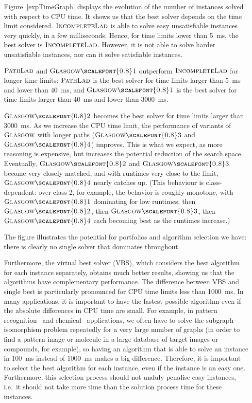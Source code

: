 \documentclass{llncs}
\newcommand{\Glasgow}{$\textsc{Glasgow}$\xspace}
\newcommand{\IncompleteLAD}{$\textsc{IncompleteLad}$\xspace}
\newcommand{\PathLAD}{$\textsc{PathLad}$\xspace}
\newcommand{\GlasgowOne}{$\textsc{Glasgow{\scalefont{0.8}1}}$\xspace}
\newcommand{\GlasgowTwo}{$\textsc{Glasgow{\scalefont{0.8}2}}$\xspace}
\newcommand{\GlasgowThree}{$\textsc{Glasgow{\scalefont{0.8}3}}$\xspace}
\newcommand{\GlasgowFour}{$\textsc{Glasgow{\scalefont{0.8}4}}$\xspace}
\begin{document}
Figure~\ref{expTimeGraph} displays the evolution of the number of instances solved with respect to
CPU time. It shows us that the best solver depends on the time limit considered. \IncompleteLAD is
able to solve easy unsatisfiable instances very quickly, in a few milliseconds. Hence, for time
limits lower than \SI{5}{\ms}, the best solver is \IncompleteLAD. However, it is not able to solve harder
unsatisfiable instances, nor can it solve satisfiable instances.

\PathLAD and \GlasgowOne outperform \IncompleteLAD for longer time limits: \PathLAD is the
best solver for time limits larger than \SI{5}{\ms} and lower than \SI{40}{\ms}, and \GlasgowOne is the best solver
for time limits larger than \SI{40}{\ms} and lower than \SI{3000}{\ms}.

\GlasgowTwo becomes the best solver for time limits larger than \SI{3000}{\ms}.
As we increase the CPU time limit, the performance of variants of \Glasgow with
longer paths (\GlasgowThree and \GlasgowFour) improves. This is what we expect,
as more reasoning is expensive, but increases the potential reduction of the
search space. Eventually, \GlasgowTwo and \GlasgowThree become very closely
matched, and with runtimes very close to the limit, \GlasgowFour nearly catches
up. (This behaviour is class-dependent: over class 2, for example, the behavior
is roughly monotone, with \GlasgowOne dominating for low runtimes, then
\GlasgowTwo, then \GlasgowThree, then \GlasgowFour each becoming best as the runtimes
increase.)

The figure illustrates the potential for portfolios and algorithm selection we have: there is
clearly no single solver that dominates throughout.

Furthermore, the virtual best solver (VBS), which considers the best algorithm
for each instance separately, obtains much better results, showing us that the
algorithms have complementary performance. The difference between VBS and single
best is particularly pronounced for CPU time limits less than \SI{1000}{\ms}. In
many applications, it is important to have the fastest possible algorithm even
if the absolute differences in CPU time are small. For example, in pattern
recognition~\cite{pr15,cviu11} and chemical~\cite{Giugno:2013} applications, we
often have to solve the subgraph isomorphism problem repeatedly for a very large
number of graphs (in order to find a pattern image or molecule in a large
database of target images or compounds, for example), so having an algorithm
that is able to solve an instance in \SI{100}{\ms} instead of \SI{1000}{\ms}
makes a big difference.  Therefore, it is important to select the best algorithm
for each instance, even if the instance is an easy one. Furthermore, this
selection process should not unduly penalise easy instances, i.e.\ it should not take more time than
the solution process time for these instances.
\end{document}
